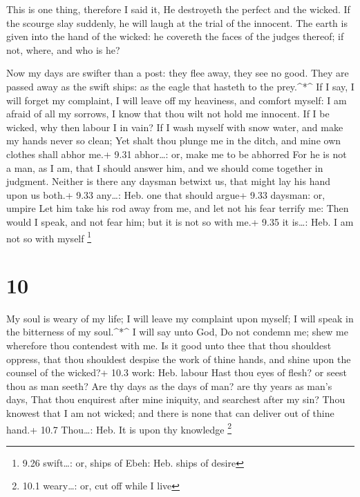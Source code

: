  This is one thing, therefore I said it, He destroyeth the
perfect and the wicked.  If the scourge slay suddenly, he
will laugh at the trial of the innocent.  The earth is
given into the hand of the wicked: he covereth the faces of the judges
thereof; if not, where, and who is he?

 Now my days are swifter than a post: they flee away, they
see no good.  They are passed away as the swift ships: as
the eagle that hasteth to the prey.\^{}*\^{}  If I say, I
will forget my complaint, I will leave off my heaviness, and comfort
myself:  I am afraid of all my sorrows, I know that thou
wilt not hold me innocent.  If I be wicked, why then labour
I in vain?  If I wash myself with snow water, and make my
hands never so clean;  Yet shalt thou plunge me in the
ditch, and mine own clothes shall abhor me.+ 9.31 abhor\ldots: or, make
me to be abhorred  For he is not a man, as I am, that I
should answer him, and we should come together in judgment.
 Neither is there any daysman betwixt us, that might lay
his hand upon us both.+ 9.33 any\ldots: Heb. one that should argue+ 9.33
daysman: or, umpire  Let him take his rod away from me, and
let not his fear terrify me:  Then would I speak, and not
fear him; but it is not so with me.+ 9.35 it is\ldots: Heb. I am not so
with myself \footnote{9.26 swift\ldots: or, ships of Ebeh: Heb. ships of
  desire}

\hypertarget{section-9}{%
\section{10}\label{section-9}}

 My soul is weary of my life; I will leave my complaint upon
myself; I will speak in the bitterness of my soul.\^{}*\^{} 
I will say unto God, Do not condemn me; shew me wherefore thou
contendest with me.  Is it good unto thee that thou
shouldest oppress, that thou shouldest despise the work of thine hands,
and shine upon the counsel of the wicked?+ 10.3 work: Heb. labour
 Hast thou eyes of flesh? or seest thou as man seeth?
 Are thy days as the days of man? are thy years as man's
days,  That thou enquirest after mine iniquity, and
searchest after my sin?  Thou knowest that I am not wicked;
and there is none that can deliver out of thine hand.+ 10.7 Thou\ldots:
Heb. It is upon thy knowledge \footnote{10.1 weary\ldots: or, cut off
  while I live}

